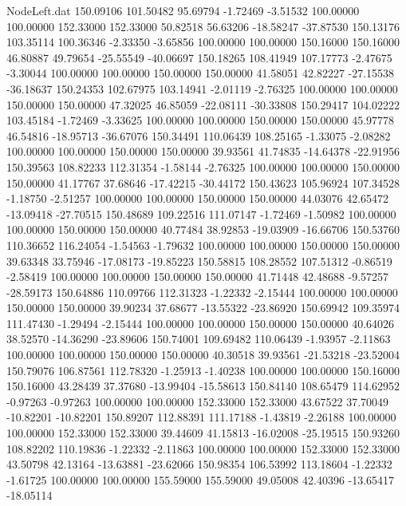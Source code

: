 \begin{filecontents}{NodeLeft.dat}
 150.09106  101.50482   95.69794    -1.72469   -3.51532  100.00000  100.00000  152.33000  152.33000   50.82518   56.63206  -18.58247  -37.87530
 150.13176  103.35114  100.36346    -2.33350   -3.65856  100.00000  100.00000  150.16000  150.16000   46.80887   49.79654  -25.55549  -40.06697
 150.18265  108.41949  107.17773    -2.47675   -3.30044  100.00000  100.00000  150.00000  150.00000   41.58051   42.82227  -27.15538  -36.18637
 150.24353  102.67975  103.14941    -2.01119   -2.76325  100.00000  100.00000  150.00000  150.00000   47.32025   46.85059  -22.08111  -30.33808
 150.29417  104.02222  103.45184    -1.72469   -3.33625  100.00000  100.00000  150.00000  150.00000   45.97778   46.54816  -18.95713  -36.67076
 150.34491  110.06439  108.25165    -1.33075   -2.08282  100.00000  100.00000  150.00000  150.00000   39.93561   41.74835  -14.64378  -22.91956
 150.39563  108.82233  112.31354    -1.58144   -2.76325  100.00000  100.00000  150.00000  150.00000   41.17767   37.68646  -17.42215  -30.44172
 150.43623  105.96924  107.34528    -1.18750   -2.51257  100.00000  100.00000  150.00000  150.00000   44.03076   42.65472  -13.09418  -27.70515
 150.48689  109.22516  111.07147    -1.72469   -1.50982  100.00000  100.00000  150.00000  150.00000   40.77484   38.92853  -19.03909  -16.66706
 150.53760  110.36652  116.24054    -1.54563   -1.79632  100.00000  100.00000  150.00000  150.00000   39.63348   33.75946  -17.08173  -19.85223
 150.58815  108.28552  107.51312    -0.86519   -2.58419  100.00000  100.00000  150.00000  150.00000   41.71448   42.48688   -9.57257  -28.59173
 150.64886  110.09766  112.31323    -1.22332   -2.15444  100.00000  100.00000  150.00000  150.00000   39.90234   37.68677  -13.55322  -23.86920
 150.69942  109.35974  111.47430    -1.29494   -2.15444  100.00000  100.00000  150.00000  150.00000   40.64026   38.52570  -14.36290  -23.89606
 150.74001  109.69482  110.06439    -1.93957   -2.11863  100.00000  100.00000  150.00000  150.00000   40.30518   39.93561  -21.53218  -23.52004
 150.79076  106.87561  112.78320    -1.25913   -1.40238  100.00000  100.00000  150.16000  150.16000   43.28439   37.37680  -13.99404  -15.58613
 150.84140  108.65479  114.62952    -0.97263   -0.97263  100.00000  100.00000  152.33000  152.33000   43.67522   37.70049  -10.82201  -10.82201
 150.89207  112.88391  111.17188    -1.43819   -2.26188  100.00000  100.00000  152.33000  152.33000   39.44609   41.15813  -16.02008  -25.19515
 150.93260  108.82202  110.19836    -1.22332   -2.11863  100.00000  100.00000  152.33000  152.33000   43.50798   42.13164  -13.63881  -23.62066
 150.98354  106.53992  113.18604    -1.22332   -1.61725  100.00000  100.00000  155.59000  155.59000   49.05008   42.40396  -13.65417  -18.05114

\end{filecontents}
